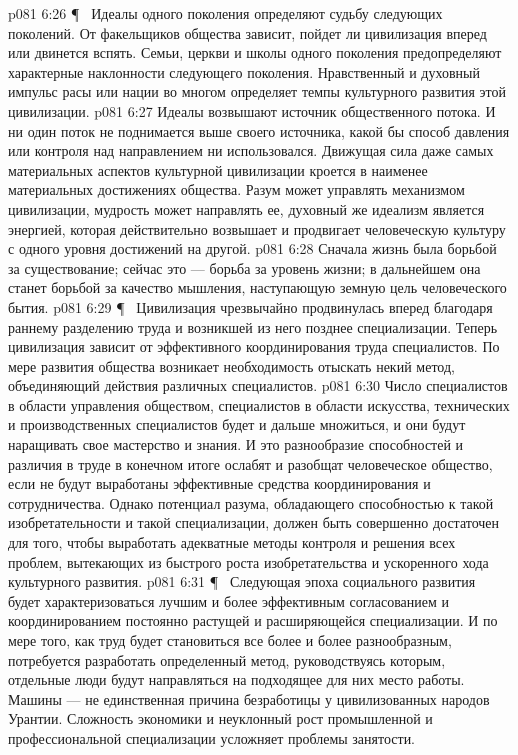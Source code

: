 \vs p081 6:26 \P\ \bibnobreakspace {} Идеалы одного поколения определяют судьбу следующих поколений. От  факельщиков общества зависит, пойдет ли цивилизация вперед или двинется вспять. Семьи, церкви и школы одного поколения предопределяют характерные наклонности следующего поколения. Нравственный и духовный импульс расы или нации во многом определяет темпы культурного развития этой цивилизации.
\vs p081 6:27 Идеалы возвышают источник общественного потока. И ни один поток не поднимается выше своего источника, какой бы способ давления или контроля над направлением ни использовался. Движущая сила даже самых материальных аспектов культурной цивилизации кроется в наименее материальных достижениях общества. Разум может управлять механизмом цивилизации, мудрость может направлять ее, духовный же идеализм является энергией, которая действительно возвышает и продвигает человеческую культуру с одного уровня достижений на другой.
\vs p081 6:28 Сначала жизнь была борьбой за существование; сейчас это --- борьба за уровень жизни; в дальнейшем она станет борьбой за качество мышления, наступающую земную цель человеческого бытия.
\vs p081 6:29 \P\ \bibnobreakspace {} Цивилизация чрезвычайно продвинулась вперед благодаря раннему разделению труда и возникшей из него позднее специализации. Теперь цивилизация зависит от эффективного координирования труда специалистов. По мере развития общества возникает необходимость отыскать некий метод, объединяющий действия различных специалистов.
\vs p081 6:30 Число специалистов в области управления обществом, специалистов в области искусства, технических и производственных специалистов будет и дальше множиться, и они будут наращивать свое мастерство и знания. И это разнообразие способностей и различия в труде в конечном итоге ослабят и разобщат человеческое общество, если не будут выработаны эффективные средства координирования и сотрудничества. Однако потенциал разума, обладающего способностью к такой изобретательности и такой специализации, должен быть совершенно достаточен для того, чтобы выработать адекватные методы контроля и решения всех проблем, вытекающих из быстрого роста изобретательства и ускоренного хода культурного развития.
\vs p081 6:31 \P\ \bibnobreakspace {} Следующая эпоха социального развития будет характеризоваться лучшим и более эффективным согласованием и координированием постоянно растущей и расширяющейся специализации. И по мере того, как труд будет становиться все более и более разнообразным, потребуется разработать определенный метод, руководствуясь которым, отдельные люди будут направляться на подходящее для них место работы. Машины --- не единственная причина безработицы у цивилизованных народов Урантии. Сложность экономики и неуклонный рост промышленной и профессиональной специализации усложняет проблемы занятости.
